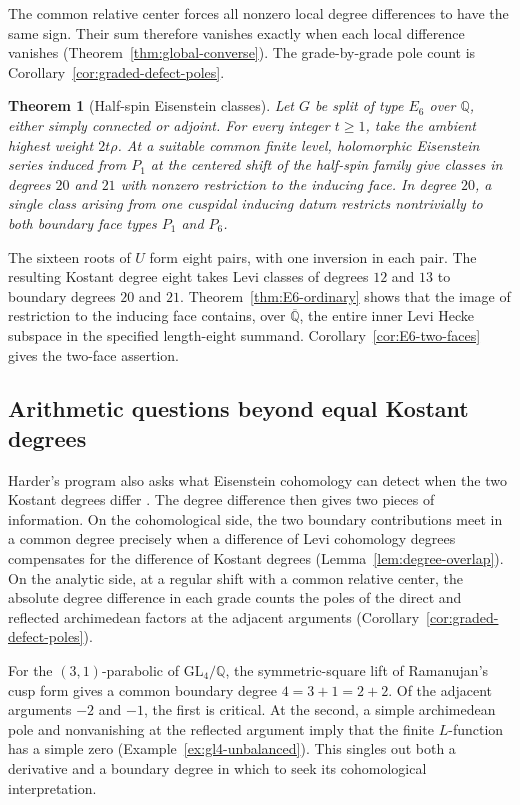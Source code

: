 \documentclass[12pt]{amsart}
\numberwithin{equation}{section}
\theoremstyle{plain}
\newtheorem{introtheorem}{Theorem}
\theoremstyle{definition}
\theoremstyle{remark}
\newcommand{\GL}{\mathrm{GL}}
\begin{document}
The common relative center forces all nonzero local degree differences to have the same sign. Their sum therefore vanishes exactly when each local difference vanishes \textup{(Theorem~\ref{thm:global-converse})}. The grade-by-grade pole count is Corollary~\ref{cor:graded-defect-poles}.

\begin{introtheorem}[Half-spin Eisenstein classes]
\label{thm:intro-E6}
Let $G$ be split of type $E_6$ over $\mathbb Q$, either simply connected or adjoint. For every integer $t\ge1$, take the ambient highest weight $2t\rho$. At a suitable common finite level, holomorphic Eisenstein series induced from $P_1$ at the centered shift of the half-spin family give classes in degrees $20$ and $21$ with nonzero restriction to the inducing face. In degree $20$, a single class arising from one cuspidal inducing datum restricts nontrivially to both boundary face types $P_1$ and $P_6$.
\end{introtheorem}

The sixteen roots of $U$ form eight pairs, with one inversion in each pair. The resulting Kostant degree eight takes Levi classes of degrees $12$ and $13$ to boundary degrees $20$ and $21$. Theorem~\ref{thm:E6-ordinary} shows that the image of restriction to the inducing face contains, over $\overline{\mathbb Q}$, the entire inner Levi Hecke subspace in the specified length-eight summand. Corollary~\ref{cor:E6-two-faces} gives the two-face assertion.

\subsection{Arithmetic questions beyond equal Kostant degrees}\label{subsec:arithmetic-unequal-degrees}
Harder's program also asks what Eisenstein cohomology can detect when the two Kostant degrees differ \cite[\S9.3.1]{HarderChapterNine}. The degree difference then gives two pieces of information. On the cohomological side, the two boundary contributions meet in a common degree precisely when a difference of Levi cohomology degrees compensates for the difference of Kostant degrees (Lemma~\ref{lem:degree-overlap}). On the analytic side, at a regular shift with a common relative center, the absolute degree difference in each grade counts the poles of the direct and reflected archimedean factors at the adjacent arguments (Corollary~\ref{cor:graded-defect-poles}).

For the $(3,1)$-parabolic of $\GL_4/\mathbb Q$, the symmetric-square lift of Ramanujan's cusp form gives a common boundary degree $4=3+1=2+2$. Of the adjacent arguments $-2$ and $-1$, the first is critical. At the second, a simple archimedean pole and nonvanishing at the reflected argument imply that the finite $L$-function has a simple zero (Example~\ref{ex:gl4-unbalanced}). This singles out both a derivative and a boundary degree in which to seek its cohomological interpretation.
\end{document}
